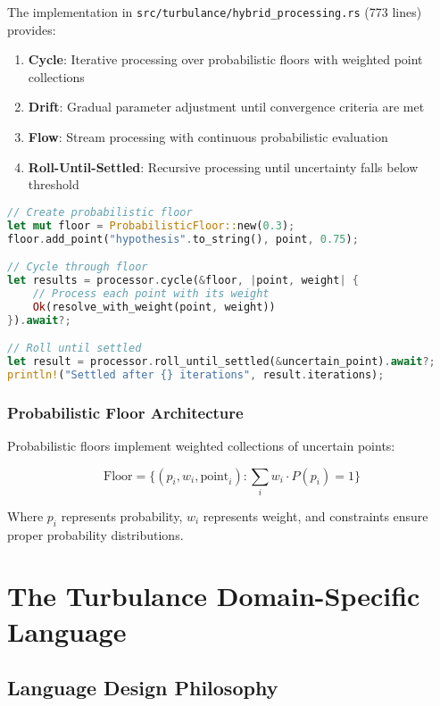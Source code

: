 \documentclass[12pt,a4paper,twoside]{article}
\begin{document}
\begin{itemize}
The implementation in \texttt{src/turbulance/hybrid\_processing.rs} (773 lines) provides:

\begin{enumerate}
\item \textbf{Cycle}: Iterative processing over probabilistic floors with weighted point collections
\item \textbf{Drift}: Gradual parameter adjustment until convergence criteria are met
\item \textbf{Flow}: Stream processing with continuous probabilistic evaluation
\item \textbf{Roll-Until-Settled}: Recursive processing until uncertainty falls below threshold
\end{enumerate}

\begin{lstlisting}[language=rust,caption=Hybrid Processing Implementation]
// Create probabilistic floor
let mut floor = ProbabilisticFloor::new(0.3);
floor.add_point("hypothesis".to_string(), point, 0.75);

// Cycle through floor
let results = processor.cycle(&floor, |point, weight| {
    // Process each point with its weight
    Ok(resolve_with_weight(point, weight))
}).await?;

// Roll until settled
let result = processor.roll_until_settled(&uncertain_point).await?;
println!("Settled after {} iterations", result.iterations);
\end{lstlisting}

\subsubsection{Probabilistic Floor Architecture}

Probabilistic floors implement weighted collections of uncertain points:

\begin{equation}
\text{Floor} = \{(p_i, w_i, \text{point}_i) : \sum_{i} w_i \cdot P(p_i) = 1\}
\end{equation}

Where $p_i$ represents probability, $w_i$ represents weight, and constraints ensure proper probability distributions.

\section{The Turbulance Domain-Specific Language}

\subsection{Language Design Philosophy}


\end{itemize}
\end{document}
